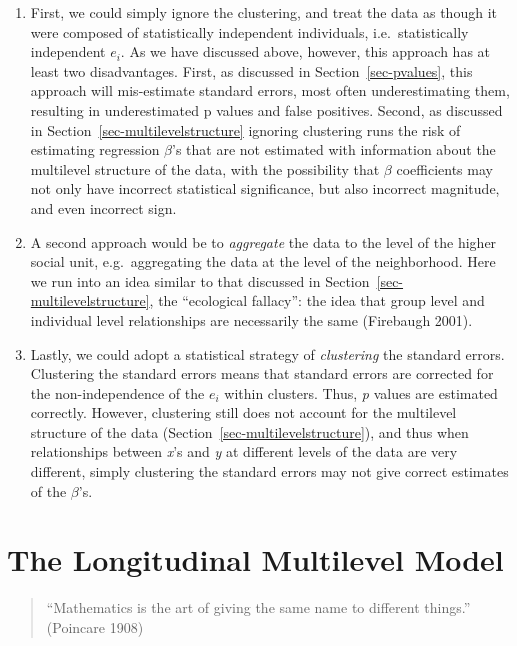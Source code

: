 \documentclass[
  letterpaper,
  DIV=11,
  numbers=noendperiod]{scrreprt}
\providecommand{\tightlist}{%
  \setlength{\itemsep}{0pt}\setlength{\parskip}{0pt}}\usepackage{longtable,booktabs,array}
\begin{document}
\begin{enumerate}
\def\labelenumi{\arabic{enumi}.}
\tightlist
\item
  First, we could simply ignore the clustering, and treat the data as
  though it were composed of statistically independent individuals,
  i.e.~statistically independent \(e_i\). As we have discussed above,
  however, this approach has at least two disadvantages. First, as
  discussed in Section~\ref{sec-pvalues}, this approach will
  mis-estimate standard errors, most often underestimating them,
  resulting in underestimated p values and false positives. Second, as
  discussed in Section~\ref{sec-multilevelstructure} ignoring clustering
  runs the risk of estimating regression \(\beta\)'s that are not
  estimated with information about the multilevel structure of the data,
  with the possibility that \(\beta\) coefficients may not only have
  incorrect statistical significance, but also incorrect magnitude, and
  even incorrect sign.
\item
  A second approach would be to \emph{aggregate} the data to the level
  of the higher social unit, e.g.~aggregating the data at the level of
  the neighborhood. Here we run into an idea similar to that discussed
  in Section~\ref{sec-multilevelstructure}, the ``ecological fallacy'':
  the idea that group level and individual level relationships are
  necessarily the same (Firebaugh 2001).
\item
  Lastly, we could adopt a statistical strategy of \emph{clustering} the
  standard errors. Clustering the standard errors means that standard
  errors are corrected for the non-independence of the \(e_i\) within
  clusters. Thus, \emph{p} values are estimated correctly. However,
  clustering still does not account for the multilevel structure of the
  data (Section~\ref{sec-multilevelstructure}), and thus when
  relationships between \emph{x}'s and \emph{y} at different levels of
  the data are very different, simply clustering the standard errors may
  not give correct estimates of the \(\beta\)'s.
\end{enumerate}


\hypertarget{the-longitudinal-multilevel-model}{%
\chapter{The Longitudinal Multilevel
Model}\label{the-longitudinal-multilevel-model}}

\begin{quote}
``Mathematics is the art of giving the same name to different things.''
(Poincare 1908)
\end{quote}
\end{document}
